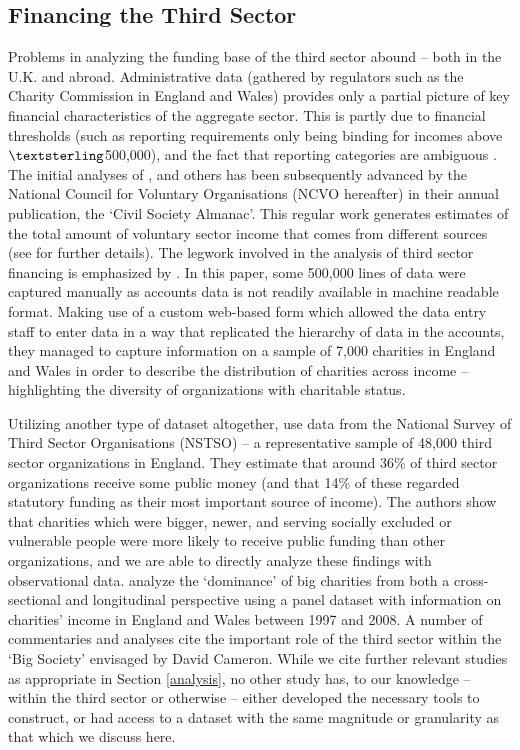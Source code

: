 \documentclass[12pt]{article}
\begin{document}
\subsection{Financing the Third Sector}

Problems in analyzing the funding base of the third sector abound -- both in the U.K. and abroad. Administrative data (gathered by regulators such as the Charity Commission in England and Wales) provides only a partial picture of key financial characteristics of the aggregate sector. This is partly due to financial thresholds (such as reporting requirements only being binding for incomes above $\textsterling$500,000), and the fact that reporting categories are ambiguous \citep[as discussed in][]{Morgan2012}. The initial analyses of \cite{Posnett1993}, \cite{OsborneHems1995} and others has been subsequently advanced by the National Council for Voluntary Organisations (NCVO hereafter) in their annual publication, the `Civil Society Almanac'. This regular work generates estimates of the total amount of voluntary sector income that comes from different sources (see \cite{ncvo2016} for further details). The legwork involved in the analysis of third sector financing is emphasized by \cite{CliffordMohan2016}. In this paper, some 500,000 lines of data were captured manually as accounts data is not readily available in machine readable format. Making use of a custom web-based form which allowed the data entry staff to enter data in a way that replicated the hierarchy of data in the accounts, they managed to capture information on a sample of 7,000 charities in England and Wales in order to describe the distribution of charities across income -- highlighting the diversity of organizations with charitable status.

Utilizing another type of dataset altogether, \cite{cliffordfreidamohan2010} use data from the National Survey of Third Sector Organisations (NSTSO) -- a representative sample of 48,000 third sector organizations in England. They estimate that around 36\% of third sector organizations receive some public money (and that 14\% of these regarded statutory funding as their most important source of income). The authors show that charities which were bigger, newer, and serving socially excluded or vulnerable people were more likely to receive public funding than other organizations, and we are able to directly analyze these findings with observational data. \cite{backusandclifford2013} analyze the `dominance' of big charities from both a cross-sectional and longitudinal perspective using a panel dataset with information on charities' income in England and Wales between 1997 and 2008. A number of commentaries and analyses cite the important role of the third sector within the `Big Society' envisaged by David Cameron. While we cite further relevant studies as appropriate in Section \ref{analysis}, no other study has, to our knowledge -- within the third sector or otherwise -- either developed the necessary tools to construct, or had access to a dataset with the same magnitude or granularity as that which we discuss here.
\end{document}
